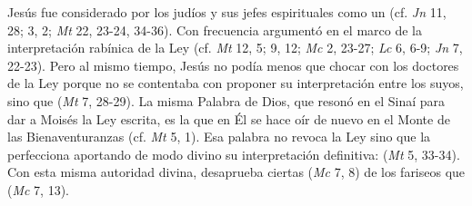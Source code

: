  Jesús fue considerado por los judíos y sus jefes espirituales como un  (cf. \emph{Jn} 11, 28; 3, 2; \emph{Mt} 22, 23-24, 34-36). Con frecuencia argumentó en el marco de la interpretación rabínica de la Ley (cf. \emph{Mt} 12, 5; 9, 12; \emph{Mc} 2, 23-27; \emph{Lc} 6, 6-9; \emph{Jn} 7, 22-23). Pero al mismo tiempo, Jesús no podía menos que chocar con los doctores de la Ley porque no se contentaba con proponer su interpretación entre los suyos, sino que  (\emph{Mt} 7, 28-29). La misma Palabra de Dios, que resonó en el Sinaí para dar a Moisés la Ley escrita, es la que en Él se hace oír de nuevo en el Monte de las Bienaventuranzas (cf. \emph{Mt} 5, 1). Esa palabra no revoca la Ley sino que la perfecciona aportando de modo divino su interpretación definitiva:  (\emph{Mt} 5, 33-34). Con esta misma autoridad divina, desaprueba ciertas  (\emph{Mc} 7, 8) de los fariseos que  (\emph{Mc} 7, 13).